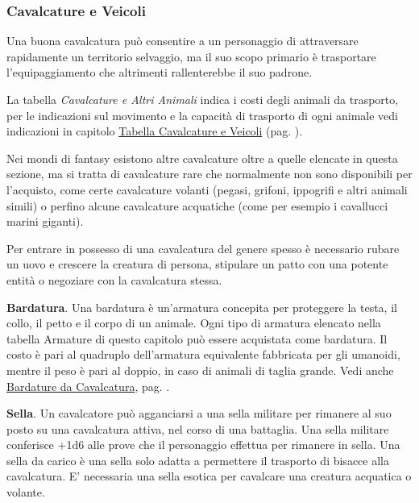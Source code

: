 \begin{multicols}{2}

\subsubsection{Cavalcature e Veicoli}

Una buona cavalcatura può consentire a un personaggio di attraversare rapidamente un territorio selvaggio, ma il suo scopo primario è trasportare l'equipaggiamento che altrimenti rallenterebbe il suo padrone.

La tabella \emph{Cavalcature e Altri Animali} indica i costi degli animali da trasporto, per le indicazioni sul movimento e la capacità di trasporto di ogni animale vedi indicazioni in capitolo \hyperlink{tabella-cavalcature-e-veicoli}{Tabella Cavalcature e Veicoli} (pag. \pageref{tabella-cavalcature-e-veicoli}).

Nei mondi di fantasy esistono altre cavalcature oltre a quelle elencate in questa sezione, ma si tratta di cavalcature rare che normalmente non sono disponibili per l'acquisto, come certe cavalcature volanti (pegasi, grifoni, ippogrifi e altri animali simili) o perfino alcune cavalcature acquatiche (come per esempio i cavallucci marini giganti).

Per entrare in possesso di una cavalcatura del genere spesso è necessario rubare un uovo e crescere la creatura di persona, stipulare un patto con una potente entità o negoziare con la cavalcatura stessa.

\textbf{Bardatura}. Una bardatura è un'armatura concepita per proteggere la testa, il collo, il petto e il corpo di un animale. Ogni tipo di armatura elencato nella tabella Armature di questo capitolo può essere acquistata come bardatura. Il costo è pari al quadruplo dell'armatura equivalente fabbricata per gli umanoidi, mentre il peso è pari al doppio, in caso di animali di taglia grande. Vedi anche \hyperlink{ArmaturedaCavallo}{Bardature da Cavalcatura}, pag. \pageref{ArmaturedaCavallo}.

\textbf{Sella}\hypertarget{Sella}{}. Un cavalcatore può agganciarsi a una sella militare per rimanere al suo posto su una cavalcatura attiva, nel corso di una battaglia. Una sella militare conferisce +1d6 alle prove che il personaggio effettua per rimanere in sella. Una sella da carico è una sella solo adatta a permettere il trasporto di bisacce alla cavalcatura. E' necessaria una sella esotica per cavalcare una creatura acquatica o volante.


\end{multicols}
